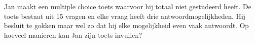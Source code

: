 \documentclass[12pt]{article}
\begin{document}
Jan maakt een multiple choice toets waarvoor hij totaal niet gestudeerd heeft. De toets bestaat uit 15 vragen en elke vraag heeft drie antwoordmogelijkheden. Hij besluit te gokken maar wel zo dat hij elke mogelijkheid even vaak antwoordt. Op hoeveel manieren kan Jan zijn toets invullen?
\end{document}
